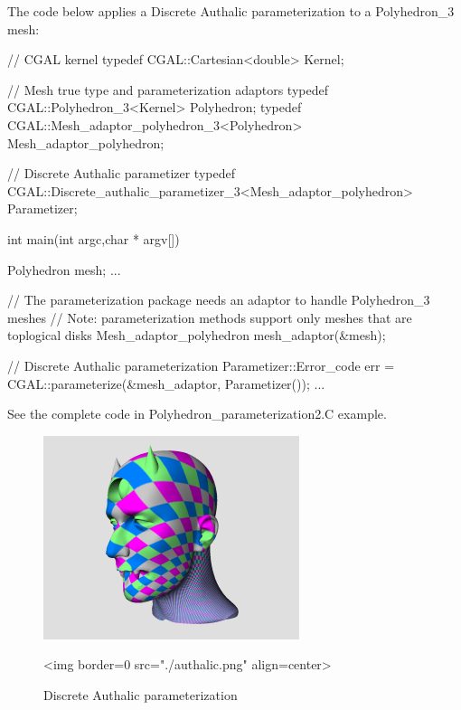 The code below applies a Discrete Authalic parameterization to a Polyhedron\_3 mesh:

\begin{ccExampleCode}

// CGAL kernel
typedef CGAL::Cartesian<double>                         Kernel;

// Mesh true type and parameterization adaptors
typedef CGAL::Polyhedron_3<Kernel>                      Polyhedron;
typedef CGAL::Mesh_adaptor_polyhedron_3<Polyhedron>     Mesh_adaptor_polyhedron;

// Discrete Authalic parametizer
typedef CGAL::Discrete_authalic_parametizer_3<Mesh_adaptor_polyhedron>
                                                        Parametizer;

int main(int argc,char * argv[])
{
    Polyhedron mesh;
    ...

    // The parameterization package needs an adaptor to handle Polyhedron_3 meshes
    // Note: parameterization methods support only meshes that are toplogical disks
    Mesh_adaptor_polyhedron mesh_adaptor(&mesh);

    // Discrete Authalic parameterization
    Parametizer::Error_code err = CGAL::parameterize(&mesh_adaptor, Parametizer());
    ...
}

\end{ccExampleCode}

See the complete code in Polyhedron\_parameterization2.C example.

\begin{figure}[bht]
    \begin{center}
        \begin{ccTexOnly}
            \includegraphics{Parameterization/authalic} %
        \end{ccTexOnly}
        \begin{ccHtmlOnly}
            <img border=0 src="./authalic.png" align=center>
        \end{ccHtmlOnly}
        \label{parameterization-fig-authalic}

        \caption{Discrete Authalic parameterization}
    \end{center}
\end{figure}



